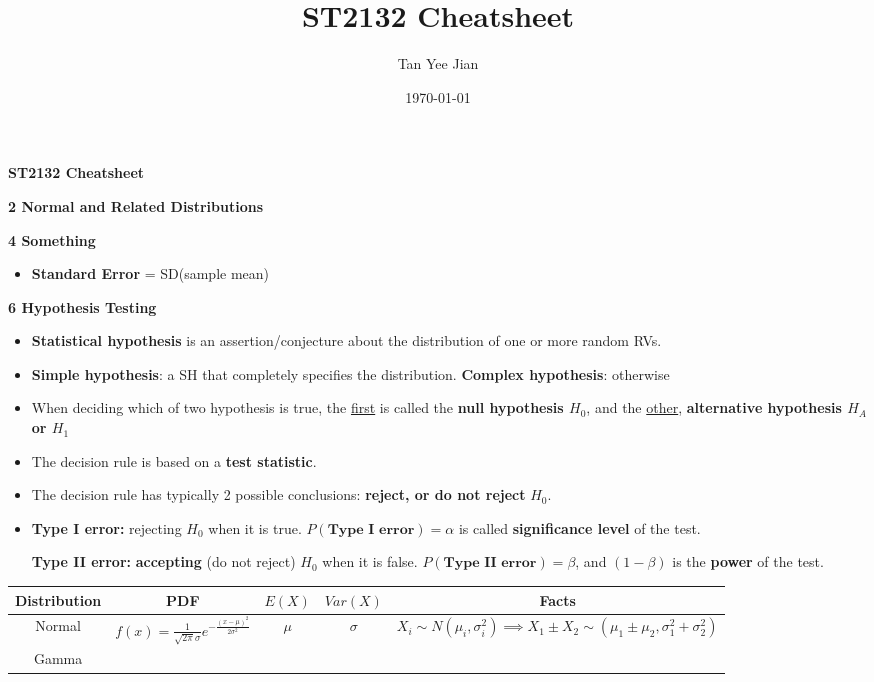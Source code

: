 \documentclass[5pt, a4paper,landscape]{article}
\title{ST2132 Cheatsheet}
\author{Tan Yee Jian}
\date{\today}
\begin{document}
\begin{center}
	{\textbf{ST2132 Cheatsheet}}
\end{center}

\begin{multicols*}{3}
	\textbf{2 Normal and Related Distributions}


	\hrulefill

	\textbf{4 Something}

	\begin{itemize}
		\item \textbf{Standard Error} = SD(sample mean)
	\end{itemize}

	\hrulefill

	\textbf{6 Hypothesis Testing}
	\begin{itemize}
		\item
		      \textbf{Statistical hypothesis} is an assertion/conjecture about
		      the distribution of one or more random RVs.
		\item
		      \textbf{Simple hypothesis}: a SH that completely specifies the
		      distribution. \textbf{Complex hypothesis}: otherwise
		\item
		      When deciding which of two hypothesis is true, the \underline{first} is
		      called the \textbf{null hypothesis \(H_0\)}, and the \underline{other},
		      \textbf{alternative hypothesis \(H_A\) or \(H_1\)}
		\item
		      The decision rule is based on a \textbf{test statistic}.
		\item
		      The decision rule has typically 2 possible conclusions: \textbf{reject,
			      or do not reject} \(H_0\).
		\item
		      \textbf{Type I error:} rejecting \(H_0\) when it is true.
		      $P(\textbf{Type I error})=\alpha$ is called \textbf{significance level}
		      of the test.

		      \textbf{Type II error:} \textbf{accepting} (do not reject) \(H_0\) when it
		      is false. $P(\textbf{Type II error})=\beta$, and $(1-\beta)$ is the
		      \textbf{power} of the test.
	\end{itemize}
\end{multicols*}
\begin{tabular}{c|c|c|c|c}
	Distribution                                                       & PDF      &
	$E(X)$                                                             & $Var(X)$ & Facts \\

	\hline
	Normal                                                             &
	$f(x)=\frac{1}{\sqrt{2\pi}\sigma}e^{-\frac{(x-\mu)^2}{2\sigma^2}}$ &
	$\mu$                                                              &
	$\sigma$                                                           &
	$X_i\sim N(\mu_i,\sigma_i^2)\implies X_1\pm X_2\sim
		(\mu_1\pm\mu_2,\sigma_1^2+\sigma_2^2)$                                                \\
	Gamma                                                              &
\end{tabular}
\end{document}

